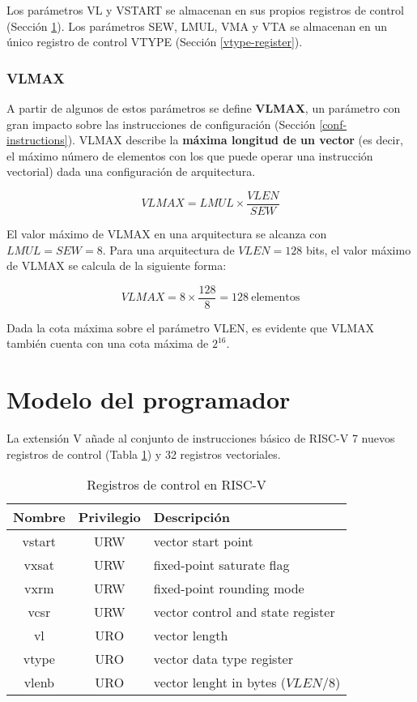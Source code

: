 Los parámetros VL y VSTART se almacenan en sus propios registros de control (Sección \ref{programmer-model}). Los parámetros SEW, LMUL, VMA y VTA se almacenan en un único registro de control VTYPE (Sección \ref{vtype-register}).

\subsubsection{VLMAX}\label{vlmax}
A partir de algunos de estos parámetros se define \textbf{VLMAX}, un parámetro con gran impacto sobre las instrucciones de configuración (Sección \ref{conf-instructions}). VLMAX describe la \textbf{máxima longitud de un vector} (es decir, el máximo número de elementos con los que puede operar una instrucción vectorial) dada una configuración de arquitectura.

$$VLMAX = LMUL \times \frac{VLEN}{SEW}$$

El valor máximo de VLMAX en una arquitectura se alcanza con $LMUL = SEW = 8$. Para una arquitectura de $VLEN = 128$ bits, el valor máximo de VLMAX se calcula de la siguiente forma: 

$$VLMAX = 8 \times \frac{128}{8} = 128~\text{elementos}$$

Dada la cota máxima sobre el parámetro VLEN, es evidente que VLMAX también cuenta con una cota máxima de $2^{16}$.

\section{Modelo del programador}\label{programmer-model}
La extensión V añade al conjunto de instrucciones básico de RISC-V 7 nuevos registros de control (Tabla \ref{control-regs}) y 32 registros vectoriales.

\begin{table}[H]
    \begin{tabular}{@{}ccl@{}}
        \toprule 
        Nombre & Privilegio & \phantom{~~~~~~~~~~~~~~~~}Descripción\\
        \midrule 
        vstart & URW\footnotemark[1] & vector start point\\
        vxsat  & URW & fixed-point saturate flag\\
        vxrm   & URW & fixed-point rounding mode\\
        vcsr   & URW & vector control and state register\\
        vl     & URO\footnotemark[2] & vector length\\
        vtype  & URO & vector data type register\\
        vlenb  & URO & vector lenght in bytes ($VLEN / 8$)\\
        \bottomrule 
    \end{tabular}
    \caption{Registros de control en RISC-V}
    \label{control-regs}
\end{table}

